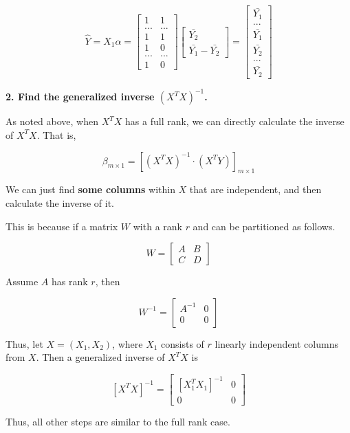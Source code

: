 \documentclass[]{book}
\begin{document}
\[\hat{Y}=X_1 \hat{\alpha}=\begin{bmatrix}
1 & 1 \\
... & ...  \\
1 & 1 \\
1 & 0  \\ 
... & ... \\
1 & 0  \end{bmatrix} \begin{bmatrix}
\bar{Y_2}\\ \bar{Y_1}-\bar{Y_2} \end{bmatrix}=\begin{bmatrix}
\bar{Y_1}  \\
...   \\
\bar{Y_1} \\
\bar{Y_2}   \\ 
... \\
\bar{Y_2} \end{bmatrix}\]

\textbf{2. Find the generalized inverse \((X^TX)^{-1}\). }

As noted above, when \(X^TX\) has a full rank, we can directly calculate the inverse of \(X^TX\). That is,

\[\beta_{m \times 1}=[(X^TX)^{-1} \cdot (X^TY)]_{m \times 1}\]

We can just find \textbf{some columns} within \(X\) that are independent, and then calculate the inverse of it.

This is because if a matrix \(W\) with a rank \(r\) and can be partitioned as follows.

\[W=\begin{bmatrix}
A & B  \\
C & D \end{bmatrix}\]

Assume \(A\) has rank \(r\), then

\[W^{-1}=\begin{bmatrix}
A^{-1} &0  \\
0 & 0 \end{bmatrix}\]

Thus, let \(X=(X_1, X_2)\), where \(X_1\) consists of \(r\) linearly independent columns from \(X\). Then a generalized inverse of \(X^TX\) is

\[[X^TX]^{-1}=\begin{bmatrix}
[X_1^TX_1]^{-1}&0  \\
0 & 0 \end{bmatrix}\]

Thus, all other steps are similar to the full rank case.
\end{document}
